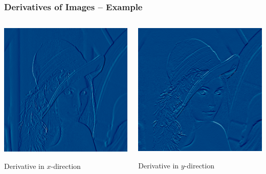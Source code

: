 \begin{frame}
    \frametitle{Derivatives of Images -- Example}
    \begin{columns}[T, onlytextwidth]
        \begin{column}{0.5\textwidth}\centering
            \includegraphics[height=0.7\textheight]{img/lena_dx}

            Derivative in $x$-direction
        \end{column}
        \begin{column}{0.5\textwidth}\centering
            \includegraphics[height=0.7\textheight]{img/lena_dy}

            Derivative in $y$-direction
        \end{column}
    \end{columns}
\end{frame}

